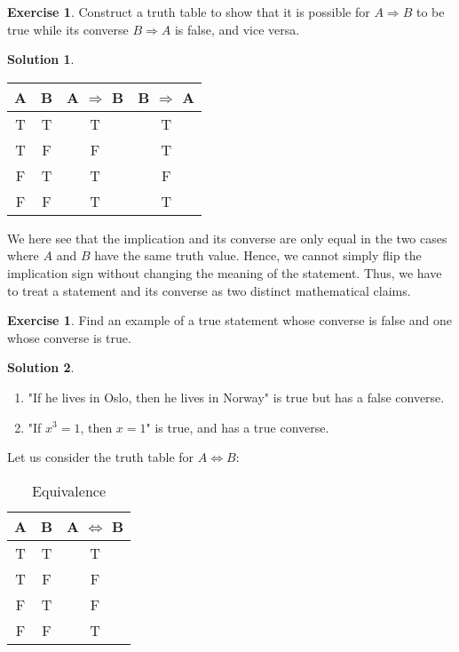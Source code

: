 \documentclass[a4paper, 11pt]{report}
\theoremstyle{plain}
\theoremstyle{definition}
\newtheorem{exrc}[thm]{Exercise}
\newtheorem*{sltn}{Solution}
\newcommand{\impl}{\Longrightarrow}
\newcommand{\eqvl}{\Longleftrightarrow}
\begin{document}
\pagebreak
\begin{exrc}
  Construct a truth table to show that it is possible for $A \impl B$ to be
  true while its converse $B \impl A$ is false, and vice versa.
\end{exrc}
\begin{sltn}
\begin{table}[h!]
  \centering
  \begin{tabular}{cccc}
    \hline
    A & B & A $\impl$ B & B $\impl$ A \\
    \hline
    T & T & T& T\\
    T & F & F& T\\
    F & T & T& F\\
    F & F & T& T\\
    \hline
  \end{tabular}
\end{table}
We here see that the implication and its converse are only equal in the two
cases where $A$ and $B$ have the same truth value. Hence, we cannot simply flip
the implication sign without changing the meaning of the statement.  Thus, we
have to treat a statement and its converse as two distinct mathematical claims.
\end{sltn}
\begin{exrc}
  Find an example of a true statement whose converse is false and one whose converse is true. 
\end{exrc}
\begin{sltn}
\begin{enumerate}
  \item "If he lives in Oslo, then he lives in Norway" is true but has a false converse.
  \item "If $x^3 = 1$, then $x = 1$" is true, and has a true converse.
\end{enumerate}
\end{sltn}

Let us consider the truth table for $A \eqvl B$:
\begin{table}[h!]
  \centering
  \caption{Equivalence}
  \label{tab:equivalence}
  \begin{tabular}{ccc}
  \hline
   A&  B& A $\eqvl$ B\\
   \hline
   T&  T& T\\
   T&  F& F\\
   F&  T& F\\
   F&  F& T\\
   \hline
  \end{tabular}
\end{table}
\end{document}
